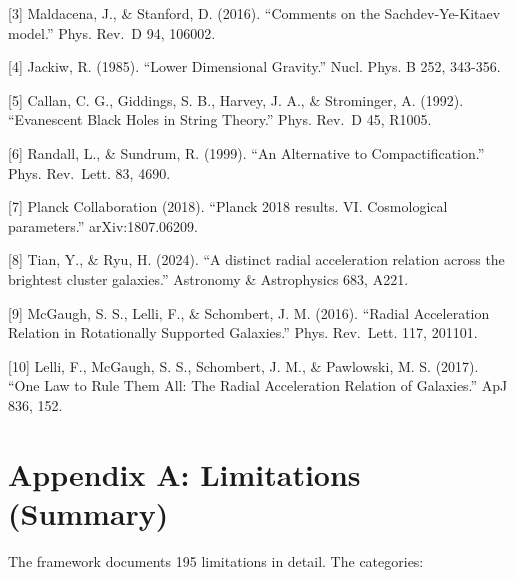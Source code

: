 \documentclass[11pt,a4paper]{article}
\begin{document}
{[}3{]} Maldacena, J., \& Stanford, D. (2016). ``Comments on the
Sachdev-Ye-Kitaev model.'' Phys. Rev.~D 94, 106002.

{[}4{]} Jackiw, R. (1985). ``Lower Dimensional Gravity.'' Nucl. Phys. B
252, 343-356.

{[}5{]} Callan, C. G., Giddings, S. B., Harvey, J. A., \& Strominger, A.
(1992). ``Evanescent Black Holes in String Theory.'' Phys. Rev.~D 45,
R1005.

{[}6{]} Randall, L., \& Sundrum, R. (1999). ``An Alternative to
Compactification.'' Phys. Rev.~Lett. 83, 4690.

{[}7{]} Planck Collaboration (2018). ``Planck 2018 results. VI.
Cosmological parameters.'' arXiv:1807.06209.

{[}8{]} Tian, Y., \& Ryu, H. (2024). ``A distinct radial acceleration
relation across the brightest cluster galaxies.'' Astronomy \&
Astrophysics 683, A221.

{[}9{]} McGaugh, S. S., Lelli, F., \& Schombert, J. M. (2016). ``Radial
Acceleration Relation in Rotationally Supported Galaxies.'' Phys.
Rev.~Lett. 117, 201101.

{[}10{]} Lelli, F., McGaugh, S. S., Schombert, J. M., \& Pawlowski, M.
S. (2017). ``One Law to Rule Them All: The Radial Acceleration Relation
of Galaxies.'' ApJ 836, 152.

\hypertarget{appendix-a-limitations-summary}{%
\section{Appendix A: Limitations
(Summary)}\label{appendix-a-limitations-summary}}

The framework documents 195 limitations in detail. The categories:
\end{document}
